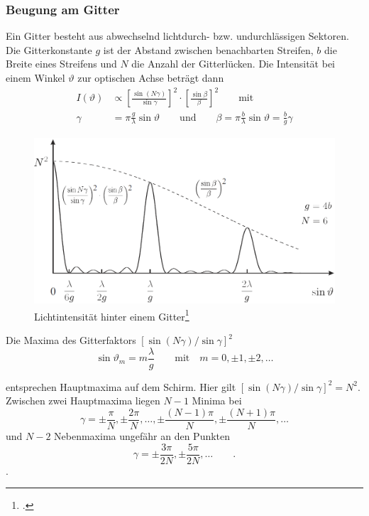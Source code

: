 \subsubsection{Beugung am Gitter}
Ein Gitter besteht aus abwechselnd lichtdurch- bzw. undurchlässigen Sektoren. Die Gitterkonstante $g$ ist der Abstand zwischen benachbarten Streifen, $b$ die Breite eines Streifens und $N$ die Anzahl der Gitterlücken. Die Intensität bei einem Winkel $\vartheta$ zur optischen Achse beträgt dann
\begin{align}
I(\vartheta)&\propto \left[\frac{\sin(N\gamma)}{\sin\gamma}\right]^2\cdot\left[\frac{\sin\beta}{\beta}\right]^2 \qquad\text{mit}\nonumber \\
\gamma&=\pi\frac{g}{\lambda}\sin\vartheta \qquad \text{und}\qquad\beta=\pi\frac{b}{\lambda}\sin\vartheta=\frac{b}{g}\gamma
\label{eq:gitterintens}
\end{align}
\begin{figure}[!htb]
  \centering
  \includegraphics[width=.8\textwidth]{res/gitterintens}
  \caption{Lichtintensität hinter einem Gitter\footcite{anleitung-ss2015}}
  \label{fig:gitterintens}
\end{figure}
Die Maxima des Gitterfaktors $[\sin(N\gamma)/\sin\gamma]^2$ 
\begin{equation}
\sin\vartheta_m=m\frac{\lambda}{g} \qquad\text{mit}\quad m=0,\pm1,\pm2,\dots
\label{eq:gittermax}
\end{equation}

entsprechen Hauptmaxima auf dem Schirm. Hier gilt $[\sin(N\gamma)/\sin\gamma]^2=N^2$. Zwischen zwei Hauptmaxima liegen $N-1$ Minima bei 
\begin{equation}
\gamma=\pm\frac{\pi}{N},\pm\frac{2\pi}{N},\dots,\pm\frac{(N-1)\pi}{N},\pm\frac{(N+1)\pi}{N},\dots
\label{eq:gittermin}
\end{equation}
und $N-2$ Nebenmaxima ungefähr an den Punkten
\begin{equation}
\gamma=\pm\frac{3\pi}{2N},\pm\frac{5\pi}{2N},\dots\qquad .
\label{eq:gitternebenmin}
\end{equation}. 

